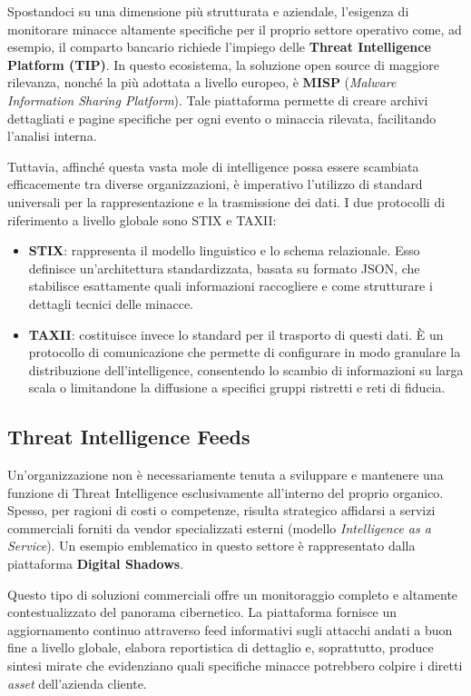 Spostandoci su una dimensione più strutturata e aziendale, l'esigenza di monitorare 
minacce altamente specifiche per il proprio settore operativo come, ad esempio, il 
comparto bancario richiede l'impiego delle \textbf{Threat Intelligence Platform (TIP)}. 
In questo ecosistema, la soluzione open source di maggiore rilevanza, nonché la più 
adottata a livello europeo, è \textbf{MISP} (\textit{Malware Information Sharing Platform}). 
Tale piattaforma permette di creare archivi dettagliati e pagine specifiche per ogni 
evento o minaccia rilevata, facilitando l'analisi interna.

Tuttavia, affinché questa vasta mole di intelligence possa essere scambiata 
efficacemente tra diverse organizzazioni, è imperativo l'utilizzo di standard 
universali per la rappresentazione e la trasmissione dei dati. I due protocolli di 
riferimento a livello globale sono STIX e TAXII:

\begin{itemize}
    \item \textbf{STIX}: rappresenta il modello linguistico e lo schema relazionale. 
    Esso definisce un'architettura standardizzata, basata su formato JSON, che 
    stabilisce esattamente quali informazioni raccogliere e come strutturare i 
    dettagli tecnici delle minacce.
    \item \textbf{TAXII}: costituisce invece lo standard per il trasporto di questi 
    dati. È un protocollo di comunicazione che permette di configurare in modo 
    granulare la distribuzione dell'intelligence, consentendo lo scambio di 
    informazioni su larga scala o limitandone la diffusione a specifici gruppi 
    ristretti e reti di fiducia.
\end{itemize}

\subsection{Threat Intelligence Feeds}

Un'organizzazione non è necessariamente tenuta a sviluppare e mantenere una funzione 
di Threat Intelligence esclusivamente all'interno del proprio organico. Spesso, per 
ragioni di costi o competenze, risulta strategico affidarsi a servizi commerciali 
forniti da vendor specializzati esterni (modello \textit{Intelligence as a Service}). 
Un esempio emblematico in questo settore è rappresentato dalla piattaforma 
\textbf{Digital Shadows}.

Questo tipo di soluzioni commerciali offre un monitoraggio completo e altamente 
contestualizzato del panorama cibernetico. La piattaforma fornisce un aggiornamento 
continuo attraverso feed informativi sugli attacchi andati a buon fine a livello 
globale, elabora reportistica di dettaglio e, soprattutto, produce sintesi mirate 
che evidenziano quali specifiche minacce potrebbero colpire i diretti \textit{asset} 
dell'azienda cliente.

